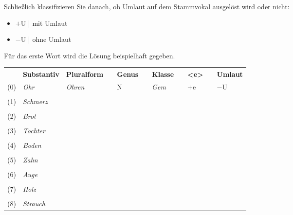 \documentclass[12pt,a4paper,twoside]{article}
\newcommand{\gruen}[1]{\textcolor{gruen}{#1}}
\newcommand{\Lf}{
  \setlength{\itemsep}{1pt}
  \setlength{\parskip}{0pt}
  \setlength{\parsep}{0pt}
}
\begin{document}
Schließlich klassifizieren Sie danach, ob Umlaut auf dem Stammvokal ausgelöst wird oder nicht:

\begin{itemize}\Lf
  \item $+$U | mit Umlaut
  \item $-$U | ohne Umlaut
\end{itemize}

Für das erste Wort wird die Lösung beispielhaft gegeben.

\newpage

\begin{center}
  \begin{longtable}[h]{rlp{}cp{}cp{}cp{}cp{}}
    \toprule
    & \textbf{Substantiv} & \textbf{Pluralform} && \textbf{Genus} && \textbf{Klasse} && \textbf{<e>} && \textbf{Umlaut} \\
    \midrule{}
    \endhead
    (0) & \textit{Ohr} & \gruen{\textit{Ohren}} && \gruen{N} && \gruen{\textit{Gem}} && \gruen{$+$e} && \gruen{$-$U} \\
    &&&&&&&& \\
    (1) & \textit{Schmerz} &&&&&&&&& \\\cline{3-3}\cline{5-5}\cline{7-7}\cline{9-9}\cline{11-11}
    &&&&&&&& \\
    (2) & \textit{Brot} &&&&&&&&& \\\cline{3-3}\cline{5-5}\cline{7-7}\cline{9-9}\cline{11-11}
    &&&&&&&& \\
    (3) & \textit{Tochter} &&&&&&&&& \\\cline{3-3}\cline{5-5}\cline{7-7}\cline{9-9}\cline{11-11}
    &&&&&&&& \\
    (4) & \textit{Boden} &&&&&&&&& \\\cline{3-3}\cline{5-5}\cline{7-7}\cline{9-9}\cline{11-11}
    &&&&&&&& \\
    (5) & \textit{Zahn} &&&&&&&&& \\\cline{3-3}\cline{5-5}\cline{7-7}\cline{9-9}\cline{11-11}
    &&&&&&&& \\
    (6) & \textit{Auge} &&&&&&&&& \\\cline{3-3}\cline{5-5}\cline{7-7}\cline{9-9}\cline{11-11}
    &&&&&&&& \\
    (7) & \textit{Holz} &&&&&&&&& \\\cline{3-3}\cline{5-5}\cline{7-7}\cline{9-9}\cline{11-11}
    &&&&&&&& \\
    (8) & \textit{Strauch} &&&&&&&&& \\\cline{3-3}\cline{5-5}\cline{7-7}\cline{9-9}\cline{11-11}

\end{longtable}
\end{center}
\end{document}
